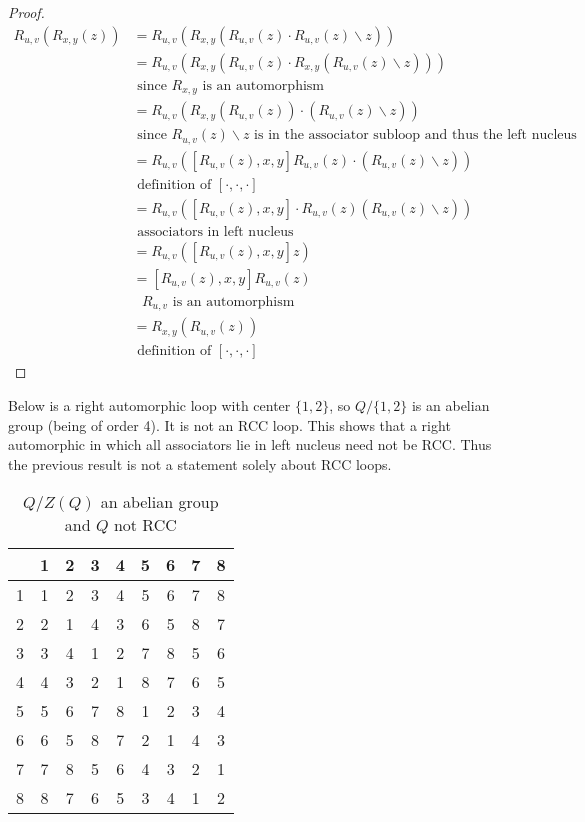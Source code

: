 \documentclass[12pt, twoside, openright]{report}
\theoremstyle{definition}
\newcommand{\ldv}{\backslash}       %
\begin{document}
\begin{proof}
  \begin{align*}
    R_{u, v}(R_{x, y}(z)) &= R_{u, v}(R_{x, y}(R_{u, v}(z)\cdot R_{u, v}(z)\ldv z))\\
    &= R_{u, v}(R_{x,y}(R_{u,v}(z)\cdot R_{x, y}(R_{u,v}(z)\ldv z)))\\
    &\text{ since $R_{x, y}$ is an automorphism}\\
    &= R_{u, v}(R_{x, y}(R_{u, v}(z))\cdot (R_{u, v}(z)\ldv z))\\
    &\text{ since $R_{u, v}(z)\ldv z$ is in the associator subloop and thus the left nucleus}\\
    &= R_{u, v}([R_{u, v}(z), x, y]R_{u, v}(z)\cdot (R_{u, v}(z)\ldv z))\\
    & \text{ definition of $[\cdot, \cdot, \cdot]$}\\
    &= R_{u, v}([R_{u, v}(z), x, y]\cdot R_{u, v}(z)(R_{u,v}(z)\ldv z))\\
    &\text{ associators in left nucleus}\\
    &= R_{u, v}([R_{u, v}(z), x, y]z) &&\\
    &= [R_{u, v}(z), x, y]R_{u, v}(z)\\
    &\text{ $R_{u, v}$ is an automorphism}\\
    &= R_{x, y}(R_{u, v}(z))\\
    &\text{ definition of $[\cdot, \cdot, \cdot]$}
  \end{align*}
\end{proof}

Below is a right automorphic loop with center $\{1,2\}$, so $Q/\{1,2\}$ is an abelian
  group (being of order 4). It is not an RCC loop. This shows that a right automorphic
  in which all associators lie in left nucleus need not be RCC. Thus the previous result
  is not a statement solely about RCC loops.

\begin{table}[H]
  \centering
  \begin{tabular}{c | c c c c c c c c}
    & 1 & 2 & 3 & 4 & 5 & 6 & 7 & 8\\
    \hline \hline
    1 & 1 & 2 & 3 & 4 & 5 & 6 & 7 & 8\\
    2 & 2 & 1 & 4 & 3 & 6 & 5 & 8 & 7\\
    3 & 3 & 4 & 1 & 2 & 7 & 8 & 5 & 6\\
    4 & 4 & 3 & 2 & 1 & 8 & 7 & 6 & 5\\
    5 & 5 & 6 & 7 & 8 & 1 & 2 & 3 & 4\\
    6 & 6 & 5 & 8 & 7 & 2 & 1 & 4 & 3\\
    7 & 7 & 8 & 5 & 6 & 4 & 3 & 2 & 1\\
    8 & 8 & 7 & 6 & 5 & 3 & 4 & 1 & 2
  \end{tabular}
  \caption{$Q/Z(Q)$ an abelian group and $Q$ not RCC}
\end{table}
\end{document}
